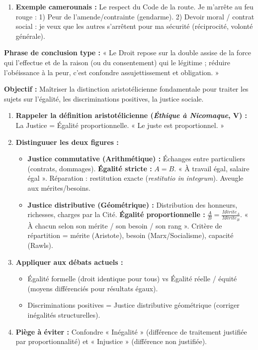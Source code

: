 \documentclass[11pt]{article}
\newcommand{\cle}[1]{{\popxbold\color{popdark}#1}}
\begin{document}
\begin{exoresolu}
\begin{enumerate}
    \item \textbf{Exemple camerounais :} Le respect du Code de la route. Je m'arrête au feu rouge : 1) Peur de l'amende/contrainte (gendarme). 2) Devoir moral / contrat social : je veux que les autres s'arrêtent pour ma sécurité (réciprocité, volonté générale).
\end{enumerate}
\textbf{Phrase de conclusion type :} « Le Droit repose sur la double assise de la force qui l'effectue et de la raison (ou du consentement) qui le légitime ; réduire l'obéissance à la peur, c'est confondre assujettissement et obligation. »
\end{exoresolu}

\begin{methode}
    \textbf{Objectif :} Maîtriser la distinction aristotélicienne fondamentale pour traiter les sujets sur l'égalité, les discriminations positives, la justice sociale.
    \begin{enumerate}
        \item \textbf{Rappeler la définition aristotélicienne (\textit{Éthique à Nicomaque}, V) :} La Justice = \cle{Égalité proportionnelle}. « Le juste est proportionnel. »
        \item \textbf{Distinguuer les deux figures :}
            \begin{itemize}
                \item \textbf{Justice commutative (Arithmétique) :} Échanges entre particuliers (contrats, dommages). \textbf{Égalité stricte :} $A = B$. « À travail égal, salaire égal ». Réparation : restitution exacte (\textit{restitutio in integrum}). Aveugle aux mérites/besoins.
                \item \textbf{Justice distributive (Géométrique) :} Distribution des honneurs, richesses, charges par la Cité. \textbf{Égalité proportionnelle :} $\frac{A}{B} = \frac{Mérite_A}{Mérite_B}$. « À chacun selon son mérite / son besoin / son rang ». Critère de répartition = \cle{mérite} (Aristote), \cle{besoin} (Marx/Socialisme), \cle{capacité} (Rawls).
            \end{itemize}
        \item \textbf{Appliquer aux débats actuels :}
            \begin{itemize}
                \item Égalité formelle (droit identique pour tous) vs Égalité réelle / équité (moyens différenciés pour résultats égaux).
                \item Discriminations positives = Justice distributive géométrique (corriger inégalités structurelles).
            \end{itemize}
        \item \textbf{Piège à éviter :} Confondre « Inégalité » (différence de traitement justifiée par proportionnalité) et « Injustice » (différence non justifiée).
    \end{enumerate}
\end{methode}
\end{document}
